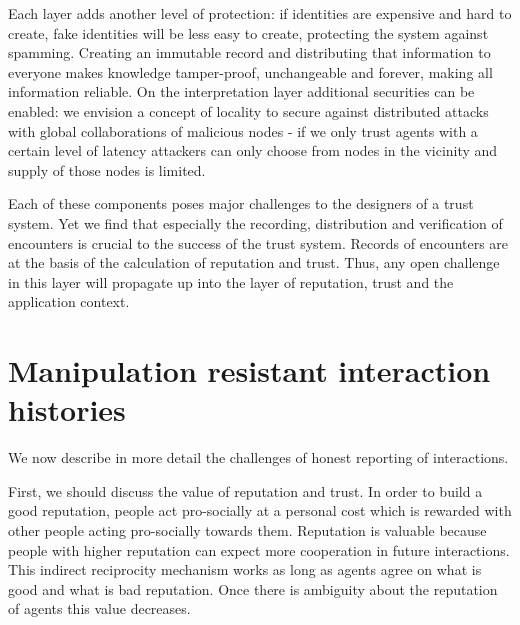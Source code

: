 
Each layer adds another level of protection: if identities are expensive and hard to create, fake 
identities will be less easy to create, protecting the system against spamming. Creating an immutable
record and distributing that information to everyone makes knowledge tamper-proof, unchangeable and 
forever, making all information reliable. On the interpretation layer additional securities can be 
enabled: we envision a concept of locality to secure against distributed attacks with global 
collaborations of malicious nodes - if we only trust agents with a certain level of latency 
attackers can only choose from nodes in the vicinity and supply of those nodes is limited. 

Each of these components poses major challenges to the designers of a trust system. Yet we find 
that especially the recording, distribution and verification of encounters is crucial to the 
success of the trust system. Records of encounters are at the basis of the calculation of
reputation and trust. Thus, any open challenge in this layer will propagate up into the layer
of reputation, trust and the application context.

\section{Manipulation resistant interaction histories}
We now describe in more detail the challenges of honest reporting of interactions.

First, we should discuss the value of reputation and trust. In order to build a good reputation,
people act pro-socially at a personal cost which is rewarded with other people acting pro-socially 
towards them. Reputation is valuable because people with higher 
reputation can expect more cooperation in future interactions. This indirect reciprocity mechanism 
works as long as agents agree on what is good and what is bad reputation. Once there is ambiguity 
about the reputation of agents this value decreases. 

